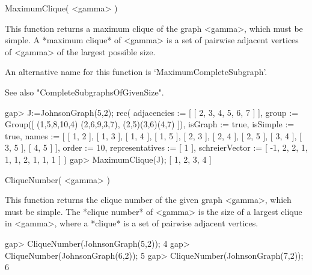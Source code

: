 

\>MaximumClique( <gamma> )

This function returns a maximum clique of the graph <gamma>, which must
be simple.  A *maximum clique*
of <gamma> is a
set of pairwise adjacent vertices of <gamma> of the largest possible size.

An alternative name for this function is
`MaximumCompleteSubgraph'.

See also "CompleteSubgraphsOfGivenSize".

\beginexample
gap> J:=JohnsonGraph(5,2);
rec( adjacencies := [ [ 2, 3, 4, 5, 6, 7 ] ], group := Group([ (1,5,8,10,4)
  (2,6,9,3,7), (2,5)(3,6)(4,7) ]), isGraph := true, isSimple := true, 
  names := [ [ 1, 2 ], [ 1, 3 ], [ 1, 4 ], [ 1, 5 ], [ 2, 3 ], [ 2, 4 ], 
      [ 2, 5 ], [ 3, 4 ], [ 3, 5 ], [ 4, 5 ] ], order := 10, 
  representatives := [ 1 ], schreierVector := [ -1, 2, 2, 1, 1, 1, 2, 1, 1, 1 
     ] )
gap> MaximumClique(J);
[ 1, 2, 3, 4 ]
\endexample


\>CliqueNumber( <gamma> )

This function returns the clique number of the given graph <gamma>,
which must be simple.  The *clique number*
of <gamma> is the size of a largest clique in <gamma>, where a *clique*
is a set of pairwise adjacent vertices.

\beginexample
gap> CliqueNumber(JohnsonGraph(5,2));
4
gap> CliqueNumber(JohnsonGraph(6,2));
5
gap> CliqueNumber(JohnsonGraph(7,2));
6
\endexample

